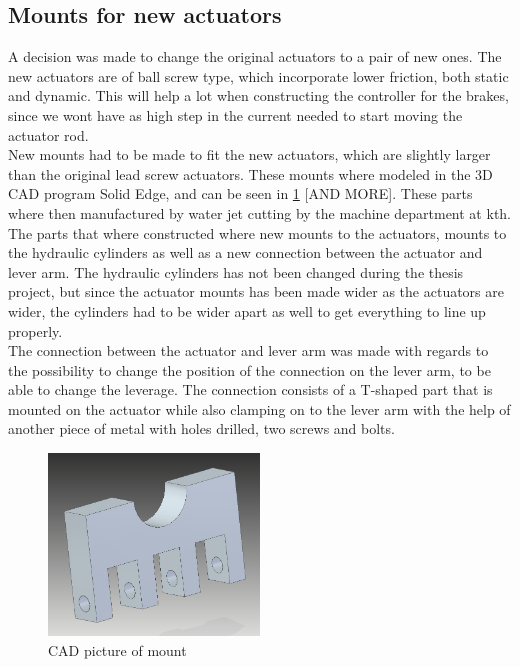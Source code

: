 \documentclass[a4paper,11pt]{kth-mag}
\begin{document}
\subsection{Mounts for new actuators}

A decision was made to change the original actuators to a pair of new ones. The new actuators are of ball screw type, which incorporate lower friction, both static and dynamic. This will help a lot when constructing the controller for the brakes, since we wont have as high step in the current needed to start moving the actuator rod. \\

New mounts had to be made to fit the new actuators, which are slightly larger than the original lead screw actuators. These mounts where modeled in the 3D CAD program Solid Edge, and can be seen in \ref{fig:CAD_Actuator_mount} [AND MORE]. These parts where then manufactured by water jet cutting by the machine department at \gls{kth}. The parts that where constructed where new mounts to the actuators, mounts to the hydraulic cylinders as well as a new connection between the actuator and lever arm. The hydraulic cylinders has not been changed during the thesis project, but since the actuator mounts has been made wider as the actuators are wider, the cylinders had to be wider apart as well to get everything to line up properly. \\

The connection between the actuator and lever arm was made with regards to the possibility to change the position of the connection on the lever arm, to be able to change the leverage. The connection consists of a T-shaped part that is mounted on the actuator while also clamping on to the lever arm with the help of another piece of metal with holes drilled, two screws and bolts. \\

\begin{figure}[h]
\centering
\includegraphics[width=0.5\textwidth]{Actuator_mount}
\caption{CAD picture of mount}
\label{fig:CAD_Actuator_mount}
\end{figure}
\end{document}
